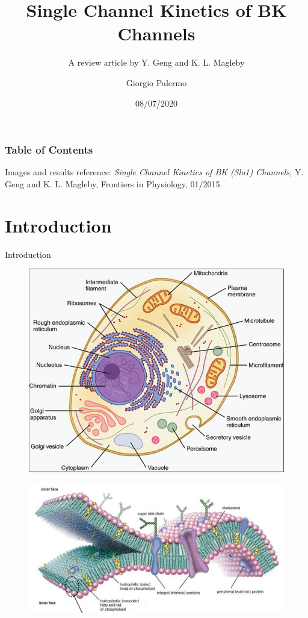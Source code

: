 \documentclass{beamer}
\title{Single Channel Kinetics of BK Channels}
\subtitle{A review article by Y. Geng and K. L. Magleby}
\author{Giorgio Palermo}
\date{08/07/2020}
\institute{LM Physics - a.a. 2019/20 - Biological Physics }
\begin{document}
\begin{frame}{}
  \titlepage
\end{frame}

\begin{frame}
\frametitle{Table of Contents}
\tableofcontents

Images and results reference: \emph{Single Channel Kinetics of BK (Slo1) Channels,} Y. Geng and K. L. Magleby, Frontiers in Physiology, 01/2015.
\end{frame}

\section{Introduction}

\begin{frame}{Introduction}
\begin{minipage}{.4\textwidth}
\begin{figure}
\centering
\includegraphics[width=\textwidth]{Cell_Cartoon.png}
\end{figure}
\end{minipage}
\hfill
\begin{minipage}{.5\textwidth}
\begin{figure}
\centering
\includegraphics[width=\textwidth]{Cell_Membrane.png}
\end{figure}
\end{minipage}


\end{frame}
\end{document}
